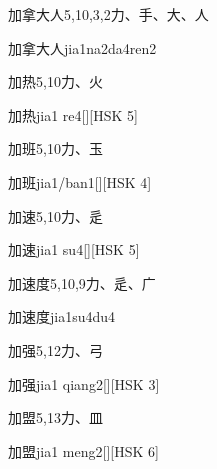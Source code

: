\begin{Entry}{加拿大人}{5,10,3,2}{⼒、⼿、⼤、⼈}
  \begin{Phonetics}{加拿大人}{jia1na2da4ren2}
  \end{Phonetics}
\end{Entry}

\begin{Entry}{加热}{5,10}{⼒、⽕}
  \begin{Phonetics}{加热}{jia1 re4}[][HSK 5]
  \end{Phonetics}
\end{Entry}

\begin{Entry}{加班}{5,10}{⼒、⽟}
  \begin{Phonetics}{加班}{jia1/ban1}[][HSK 4]
  \end{Phonetics}
\end{Entry}

\begin{Entry}{加速}{5,10}{⼒、⾡}
  \begin{Phonetics}{加速}{jia1 su4}[][HSK 5]
  \end{Phonetics}
\end{Entry}

\begin{Entry}{加速度}{5,10,9}{⼒、⾡、⼴}
  \begin{Phonetics}{加速度}{jia1su4du4}
  \end{Phonetics}
\end{Entry}

\begin{Entry}{加强}{5,12}{⼒、⼸}
  \begin{Phonetics}{加强}{jia1 qiang2}[][HSK 3]
  \end{Phonetics}
\end{Entry}

\begin{Entry}{加盟}{5,13}{⼒、⽫}
  \begin{Phonetics}{加盟}{jia1 meng2}[][HSK 6]
  \end{Phonetics}
\end{Entry}

